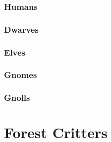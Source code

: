 \documentclass{report}
\begin{document}
\begin{multicols}{2}

\subsection{Humans}

\humanfarmer

\humansoldier

\humansoldier

\humandiplomat

\humanbard

\humanthief

\humanalchemist

\necromancer

\subsection{Dwarves}

\dwarvensoldier

\dwarventrader

\dwarvenrunemaster

\subsection{Elves}

\elf

\elf

\elvenenchanter

\subsection{Gnomes}

\gnome

\gnomishillusionist

\subsection{Gnolls}

\gnollhunter

\gnollshaman

\gnollshaman

\end{multicols}

\chapter{Forest Critters}

\begin{multicols}{2}

\bear

\boar

\chitincrawler

\basilisk

\end{multicols}
\end{document}
